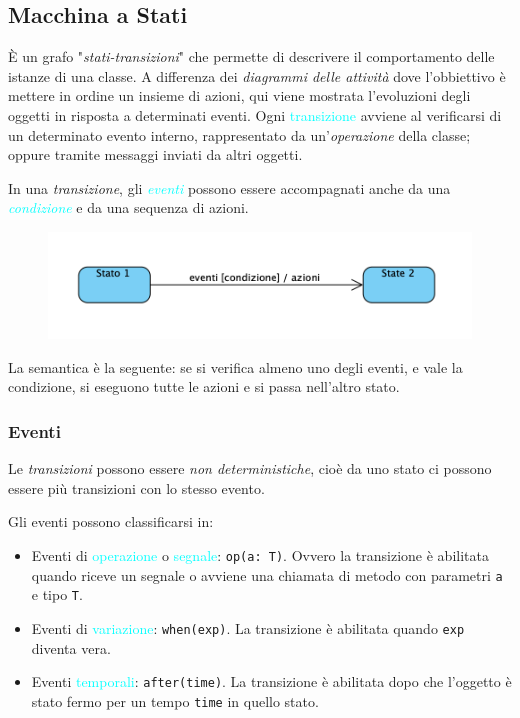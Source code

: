 \subsection{Macchina a Stati}
È un grafo "\emph{stati-transizioni}" che permette di descrivere il comportamento delle istanze di una classe.
A differenza dei \emph{diagrammi delle attività} dove l'obbiettivo è mettere in ordine un insieme di azioni, qui viene
mostrata l'evoluzioni degli oggetti in risposta a determinati eventi.
\newline\newline
Ogni \textcolor{cyan}{transizione} avviene al verificarsi di un determinato evento interno, rappresentato da un'\emph{operazione}
della classe; oppure tramite messaggi inviati da altri oggetti.

In una \emph{transizione}, gli \emph{\textcolor{cyan}{eventi}} possono essere accompagnati
anche da una \emph{\textcolor{cyan}{condizione}} e da una sequenza di azioni.

\begin{figure}[h]
    \centering
    \includegraphics[scale=0.7]{img/machinediagram.png}
\end{figure}

La semantica è la seguente: se si verifica almeno uno degli eventi, e vale la condizione, si eseguono
tutte le azioni e si passa nell'altro stato.

\subsubsection{Eventi}

Le \emph{transizioni} possono essere \emph{non deterministiche}, cioè da uno stato ci possono
essere più transizioni con lo stesso evento.

Gli eventi possono classificarsi in:
\begin{itemize}
    \item Eventi di \textcolor{cyan}{operazione} o \textcolor{cyan}{segnale}: \verb|op(a: T)|. Ovvero la transizione
        è abilitata quando riceve un segnale o avviene una chiamata di metodo con parametri \verb|a| e tipo \verb|T|.
    \item Eventi di \textcolor{cyan}{variazione}: \verb|when(exp)|. La transizione è abilitata quando \verb|exp| diventa vera.
    \item Eventi \textcolor{cyan}{temporali}: \verb|after(time)|. La transizione è abilitata dopo che l'oggetto è stato fermo per
        un tempo \verb|time| in quello stato.
\end{itemize}

